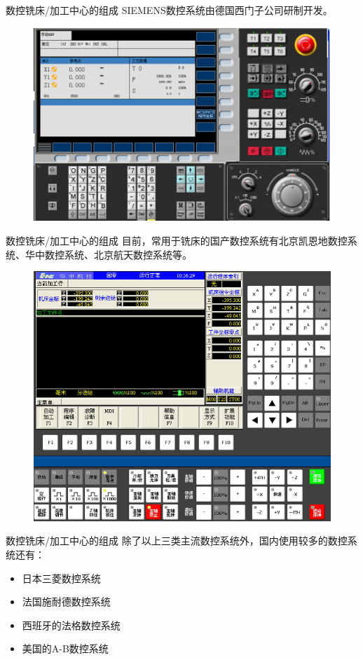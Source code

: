 \documentclass[UTF8,zihao=-4]{ctexbeamer}
\begin{document}
\begin{frame}{数控铣床/加工中心的组成}
\centering SIEMENS数控系统由德国西门子公司研制开发。

\begin{figure}
	\centering
	\includegraphics[width= 0.5\linewidth]{image/1-19}
	\label{fig:1-19}
\end{figure}

\end{frame}

\begin{frame}{数控铣床/加工中心的组成}
\centering 目前，常用于铣床的国产数控系统有北京凯恩地数控系统、华中数控系统、北京航天数控系统等。 

\begin{figure}
	\centering
	\includegraphics[width= 0.5\linewidth]{image/1-20}
	\label{fig:1-20}
\end{figure}

\end{frame}

\begin{frame}{数控铣床/加工中心的组成}
除了以上三类主流数控系统外，国内使用较多的数控系统还有：
\begin{itemize}
	\item 日本三菱数控系统
\item 法国施耐德数控系统
\item 西班牙的法格数控系统
\item 美国的A-B数控系统
\end{itemize}
\end{frame}
\end{document}
